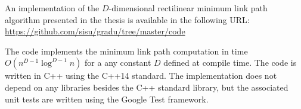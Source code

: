 \documentclass[english,gradu]{tktltiki2018}
\begin{document}
\nocite{*}



\lastpage

\appendices

\pagestyle{empty}


An implementation of the $D$-dimensional rectilinear minimum link path algorithm presented in the thesis is available in the following URL: \\
\url{https://github.com/sisu/gradu/tree/master/code}

The code implements the minimum link path computation in time $O(n^{D-1}\log^{D-1}n)$ for a any constant $D$ defined at compile time.
The code is written in C++ using the C++14 standard.
The implementation does not depend on any libraries besides the C++ standard library, but the associated unit tests are written using the Google Test framework.
\end{document}
